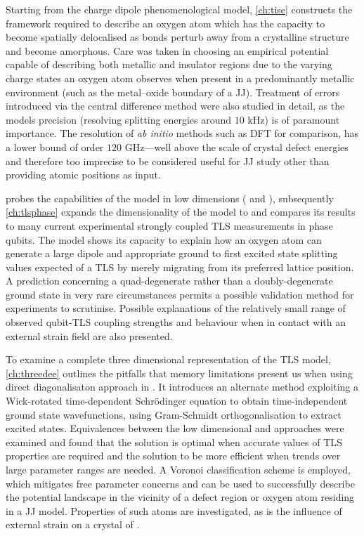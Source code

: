 Starting from the charge dipole phenomenological model, \cref{ch:tise} constructs the framework required to describe an oxygen atom which has the capacity to become spatially delocalised as bonds perturb away from a crystalline structure and become amorphous.
Care was taken in choosing an empirical potential capable of describing both metallic and insulator regions due to the varying charge states an oxygen atom observes when present in a predominantly metallic environment (such as the metal--oxide boundary of a JJ).
Treatment of errors introduced via the central difference method were also studied in detail, as the models precision (resolving splitting energies around $10$ kHz) is of paramount importance.
The resolution of \textit{ab initio} methods such as DFT for comparison, has a lower bound of order $120$ GHz---well above the scale of crystal defect energies and therefore too imprecise to be considered useful for JJ study other than providing atomic positions as input.

 probes the capabilities of the model in low dimensions ( and ), subsequently \cref{ch:tlsphase} expands the dimensionality of the model to  and compares its results to many current experimental strongly coupled TLS measurements in phase qubits.
The model shows its capacity to explain how an oxygen atom can generate a large dipole and appropriate ground to first excited state splitting values expected of a TLS by merely migrating from its preferred lattice position.
A prediction concerning a quad-degenerate rather than a doubly-degenerate ground state in very rare circumstances permits a possible validation method for experiments to scrutinise.
Possible explanations of the relatively small range of observed qubit-TLS coupling strengths and behaviour when in contact with an external strain field are also presented.

To examine a complete three dimensional representation of the TLS model, \cref{ch:threedee} outlines the pitfalls that memory limitations present us when using direct diagonalisaton approach in .
It introduces an alternate method exploiting a Wick-rotated time-dependent Schrödinger equation to obtain time-independent ground state wavefunctions, using Gram-Schmidt orthogonalisation to extract excited states.
Equivalences between the low dimensional and  approaches were examined and found that the  solution is optimal when accurate values of TLS properties are required and the  solution to be more efficient when trends over large parameter ranges are needed.
A Voronoi classification scheme is employed, which mitigates free parameter concerns and can be used to successfully describe the potential landscape in the vicinity of a defect region or oxygen atom residing in a JJ model.
Properties of such atoms are investigated, as is the influence of external strain on a crystal of .

